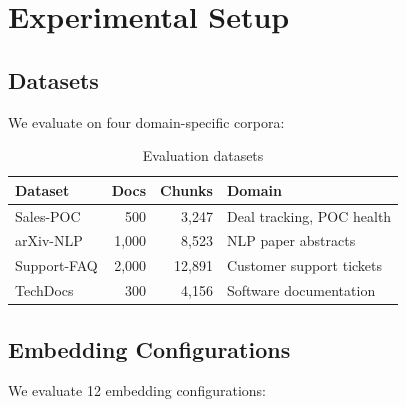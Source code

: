 \documentclass[11pt,a4paper]{article}
\begin{document}
\section{Experimental Setup}
\label{sec:experiments}

\subsection{Datasets}

We evaluate on four domain-specific corpora:

\begin{table}[h]
\centering
\small
\begin{tabular}{lrrp{4cm}}
\toprule
\textbf{Dataset} & \textbf{Docs} & \textbf{Chunks} & \textbf{Domain} \\
\midrule
Sales-POC & 500 & 3,247 & Deal tracking, POC health \\
arXiv-NLP & 1,000 & 8,523 & NLP paper abstracts \\
Support-FAQ & 2,000 & 12,891 & Customer support tickets \\
TechDocs & 300 & 4,156 & Software documentation \\
\bottomrule
\end{tabular}
\caption{Evaluation datasets}
\label{tab:datasets}
\end{table}

\subsection{Embedding Configurations}

We evaluate 12 embedding configurations:
\end{document}
